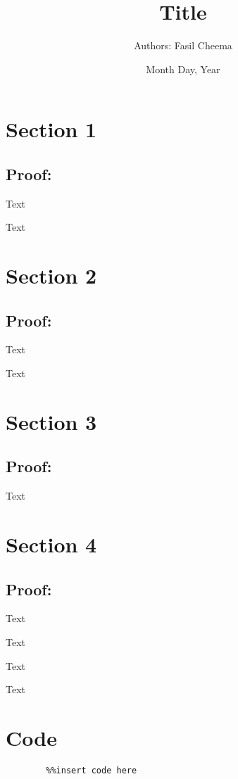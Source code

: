\documentclass{article}
\title{Title}
\author{Authors: Fasil Cheema}
\date{Month Day, Year}
\begin{document}
	\newpage
	
	\maketitle
	\newpage
	\setcounter{secnumdepth}{0}
	
	\section{Section 1}
	\subsection{Proof:}
	Text
	
	\begin{center}
		Text
	\end{center}
	
	\section{Section 2}
	\subsection{Proof:}
	Text
	\begin{center}
		Text
	\end{center}
	\section{Section 3}
	\subsection{Proof:}
	Text
	
	\section{Section 4}
	\subsection{Proof:}
	Text
	\begin{center}
		Text
	\end{center}
	
	
	\begin{center}
		Text
	\end{center}
	
	\begin{center}
		Text
	\end{center}
	
	\leavevmode
	\newline
	
	\section{Code}
	
	
	\begin{verbatim}
		%%insert code here 
	\end{verbatim}
	\leavevmode
	\newline
	
	
	
	
\end{document}
